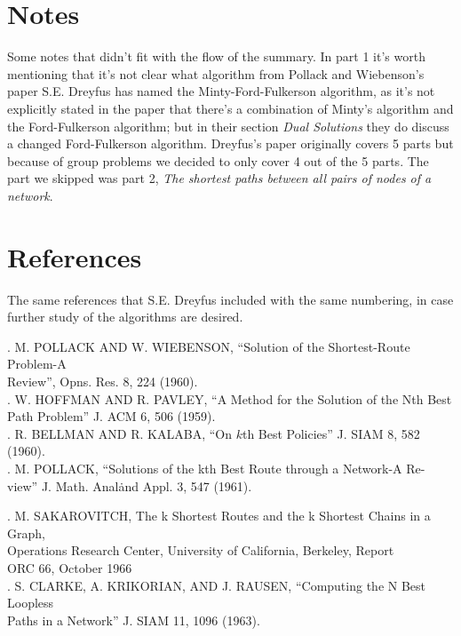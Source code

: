 \documentclass{article}
\begin{document}
\section{Notes}
Some notes that didn't fit with the flow of the summary.
In part 1 it's worth mentioning that it's not clear what algorithm from
Pollack and Wiebenson's paper S.E. Dreyfus has named the Minty-Ford-Fulkerson
algorithm, as it's not explicitly stated in the paper that there's a combination
of Minty's algorithm and the Ford-Fulkerson algorithm; but in their section \textit{Dual
Solutions} they do discuss a changed Ford-Fulkerson algorithm. Dreyfus's
paper originally covers 5 parts but because of group problems we decided to
only cover 4 out of the 5 parts. The part we skipped was part 2, 
\textit{The shortest paths between all pairs of nodes of a network}. 

\newpage

\section[short]{References}
The same references that S.E. Dreyfus included with the same numbering, in case further study of the
algorithms are desired.
\vspace{1mm}

. M. POLLACK AND W. WIEBENSON, ``Solution of the Shortest-Route Problem-A \\
\indent Review'', Opns. Res. 8, 224 (1960). \\
. W. HOFFMAN AND R. PAVLEY, ``A Method for the Solution of the Nth Best \\
\indent Path Problem'' J. ACM 6, 506 (1959). \\
. R. BELLMAN AND R. KALABA, ``On $k$th Best Policies'' J. SIAM 8, 582 \\
\indent (1960). \\
. M. POLLACK, ``Solutions of the kth Best Route through a Network-A Re- \\
\indent view'' J. Math. Anal\. and Appl. 3, 547 (1961).

. M. SAKAROVITCH, The k Shortest Routes and the k Shortest Chains in a Graph, \\
\indent Operations Research Center, University of California, Berkeley, Report \\
\indent ORC 66, October 1966 \\
. S. CLARKE, A. KRIKORIAN, AND J. RAUSEN, ``Computing the N Best Loopless \\
\indent Paths in a Network'' J. SIAM 11, 1096 (1963).
\end{document}
